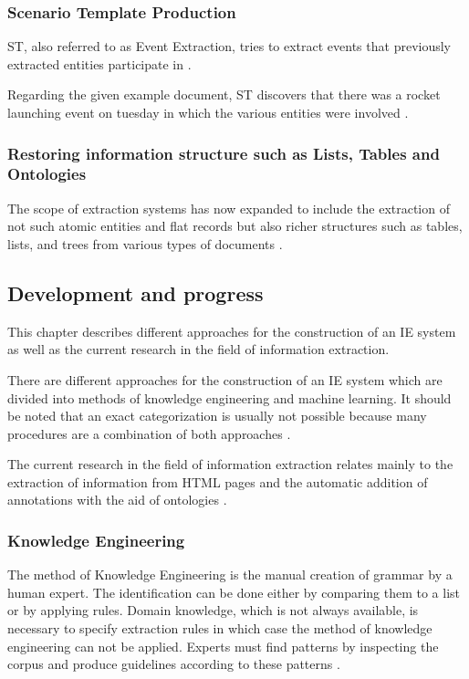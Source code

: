 \subsubsection{Scenario Template Production}
\gls{ST}, also referred to as Event Extraction, tries to extract events that previously extracted entities participate in \cite{Cunningham:2005}.

Regarding the given example document, \gls{ST} discovers that there was a rocket launching event on tuesday in which the various entities were involved \cite{Cunningham:2005}.

\subsubsection{Restoring information structure such as Lists, Tables and Ontologies}
The scope of extraction systems has now expanded to include the extraction of not such atomic entities and flat records but also richer structures such as tables, lists, and trees from various types of documents \cite{Sarawagi:2008}.

\newpage
\subsection{Development and progress}
This chapter describes different approaches for the construction of an IE system as well as the current research in the field of information extraction.

There are different approaches for the construction of an IE system which are divided into methods of knowledge engineering and machine learning. It should be noted that an exact categorization is usually not possible because many procedures are a combination of both approaches \cite{Schramm:2008}.

The current research in the field of information extraction relates mainly to the extraction of information from HTML pages and the automatic addition of annotations with the aid of ontologies \cite{Linsmayr:2010}.

\subsubsection{Knowledge Engineering}
The method of Knowledge Engineering is the manual creation of grammar by a human expert. The identification can be done either by comparing them to a list or by applying rules.  Domain knowledge, which is not always available, is necessary to specify extraction rules in which case the method of knowledge engineering can not be applied. Experts must find patterns by inspecting the corpus and produce guidelines according to these patterns \cite{Schramm:2008}\cite{Turmo:2006}.

